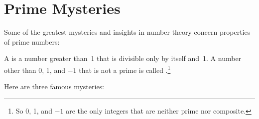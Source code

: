 \begin{problems}

\practiceproblems
{}

\classproblems
{}

\homeworkproblems
{}

\examproblems
{}

\end{problems}

\section{Prime Mysteries}

Some of the greatest mysteries and insights in number theory concern
properties of prime numbers:
\begin{definition}
A  is a number greater than~1 that is divisible only by
itself and~1.  A number other than 0, 1, and $-1$ that is not a prime
is called .\footnote{So 0, 1, and $-1$ are the only
  integers that are neither prime nor composite.}
\end{definition}

Here are three famous mysteries:


